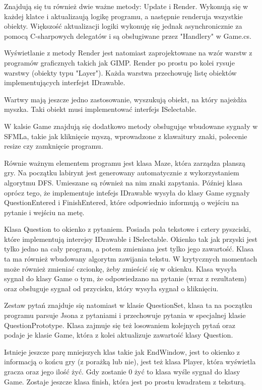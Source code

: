 \documentclass[a4paper]{article}
\begin{document}
Znajdują się tu również dwie ważne metody: Update i Render. Wykonują się w każdej klatce i aktualizaują logikę programu, a następnie renderuja wszystkie obiekty. Większość aktualizacji logiki wykonuję się jednak asynchronicznie za pomocą C-sharpowych delegatów i są obsługiwane przez "Handlery" w Game.cs.

Wyświetlanie z metody Render jest natomiast zaprojektowane na wzór warstw z programów graficznych takich jak GIMP. Render po prostu po kolei rysuje warstwy (obiekty typu "Layer"). Każda warstwa przechowuję listę obiektów implementujących interfejst IDrawable.

Wartwy mają jeszcze jedno zastosowanie, wyszukują obiekt, na który najeżdża myszka. Taki obiekt musi implementować interfejs ISelectable.

W kalsie Game znajdują się dodatkowo metody obsługująe wbudowane sygnały w SFMLa, takie jak kliknięcie myszą, wprowadzone z klawaitury znaki, polecenie resize czy zamknięcie programu.

Równie ważnym elementem programu jest klasa Maze, która zarządza planszą gry. Na początku labirynt jest generowany automatycznie z wykorzystaniem algorytmu DFS. Umieszane są również na nim znaki zapytania. Później klasa oprócz tego, że implementuje intefejs IDrawable wysyła do klasy Game sygnały QuestionEntered i FinishEntered, które odpowiednio informują o wejściu na pytanie i wejściu na metę.

Klasa Question to okienko z pytaniem. Posiada pola tekstowe i cztery pyszciski, które implementują interejsy IDrawable i ISelectable. Okienko tak jak przyski jest tylko jedno na cały program, a potem zmieniana jest tylko jego zawartość. Klasa ta ma również wbudowany algorytm zawijania tekstu. W krytycznych momentach może również zmieniać czcionkę, żeby zmieścić się w okienku. Klasa wysyła sygnał do klasy Game o tym, że odpowiedzano na pytanie (wraz z rezultatem) oraz obsługuje sygnał od przycisku, który wysyła sygnał o kliknięciu.

Zestaw pytań znajduje się natomiast w klasie QuestionSet, klasa ta na początku programu parsuje Jsona z pytaniami i przechowuje pytania w specjalnej klasie QuestionPrototype. Klasa zajmuje się też losowaniem kolejnych pytań oraz podaje je klasie Game, która z kolei aktualizuje zawartość klasy Question.

Istnieje jeszcze parę mniejszych klas takie jak EndWindow, jest to okienko z informacją o końcu gry (z porażką lub nie), jest też klasa Player, która wyświetla gracza oraz jego ilość żyć. Gdy zostanie 0 żyć to klasa wyśle sygnał do klasy Game. Zostaje jeszcze klasa finish, która jest po prostu kwadratem z teksturą.
\end{document}
